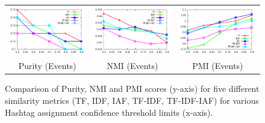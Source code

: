 \documentclass{sig-alternate}
\begin{document}
\begin{figure}[t!]
\begin{center}
{\begin{tabular}{ccc}
	\vspace{-1mm}
		\includegraphics[width=200pt]{Figs/3-1.pdf} & 
		\includegraphics[width=200pt]{Figs/3-2.pdf} & 
		\includegraphics[width=200pt]{Figs/3-3.pdf} \\

		
		{Purity (Events)} & {NMI (Events)} & 
		{PMI (Events)}\\

	
	\end{tabular}
}
\end{center}
\caption{ \footnotesize Comparison of Purity, NMI and PMI scores
  (y-axis) for five different similarity metrics (TF, IDF, IAF,
  TF-IDF, TF-IDF-IAF) for various Hashtag assignment confidence
  threshold limits (x-axis).} \label{fig-1}
\end{figure}
\end{document}

